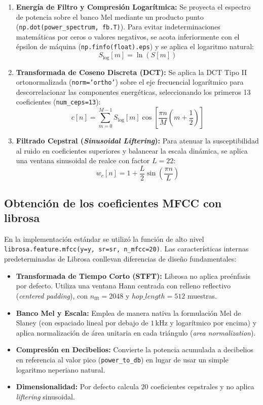 \documentclass[12pt]{article}
\begin{document}
\begin{enumerate}
	\item \textbf{Energía de Filtro y Compresión Logarítmica:} Se proyecta el espectro de potencia sobre el banco Mel mediante un producto punto (\texttt{np.dot(power\_spectrum, fb.T)}). Para evitar indeterminaciones matemáticas por ceros o valores negativos, se acota inferiormente con el épsilon de máquina (\texttt{np.finfo(float).eps}) y se aplica el logaritmo natural:
	\begin{equation}
		S_{\text{log}}[m] = \ln(S[m])
	\end{equation}
	
	\item \textbf{Transformada de Coseno Discreta (DCT):} Se aplica la DCT Tipo II ortonormalizada (\texttt{norm='ortho'}) sobre el eje frecuencial logarítmico para descorrelacionar las componentes energéticas, seleccionando los primeros 13 coeficientes (\texttt{num\_ceps=13}):
	\begin{equation}
		c[n] = \sum_{m=0}^{M-1} S_{\text{log}}[m] \cos\left[\frac{\pi n}{M}\left(m + \frac{1}{2}\right)\right]
	\end{equation}
	
	\item \textbf{Filtrado Cepstral (\textit{Sinusoidal Liftering}):} Para atenuar la susceptibilidad al ruido en coeficientes superiores y balancear la escala dinámica, se aplica una ventana sinusoidal de realce con factor $L = 22$:
	\begin{equation}
		w_c[n] = 1 + \frac{L}{2}\sin\left(\frac{\pi n}{L}\right)
	\end{equation}
\end{enumerate}

\subsection{Obtención de los coeficientes MFCC con librosa}
En la implementación estándar se utilizó la función de alto nivel \texttt{librosa.feature.mfcc(y=y, sr=sr, n\_mfcc=20)}. Las características internas predeterminadas de Librosa conllevan diferencias de diseño fundamentales:
\begin{itemize}
	\item \textbf{Transformada de Tiempo Corto (STFT):} Librosa no aplica preénfasis por defecto. Utiliza una ventana Hann centrada con relleno reflectivo (\textit{centered padding}), con $n_{\text{fft}} = 2048$ y $hop\_length = 512$ muestras.
	\item \textbf{Banco Mel y Escala:} Emplea de manera nativa la formulación Mel de Slaney (con espaciado lineal por debajo de $1\,\text{kHz}$ y logarítmico por encima) y aplica normalización de área unitaria en cada triángulo (\textit{area normalization}).
	\item \textbf{Compresión en Decibelios:} Convierte la potencia acumulada a decibelios en referencia al valor pico (\texttt{power\_to\_db}) en lugar de usar un simple logaritmo neperiano natural.
	\item \textbf{Dimensionalidad:} Por defecto calcula $20$ coeficientes cepstrales y no aplica \textit{liftering} sinusoidal.
\end{itemize}
\end{document}
